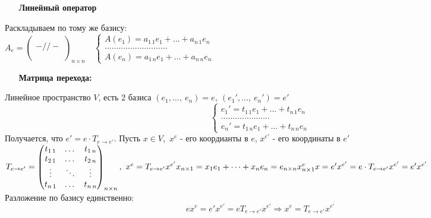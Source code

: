 \documentclass[12pt, letterpaper, twoside]{article}
\begin{document}
    \begin{enumerate}
        \item[\textbf{Линейный оператор}]
    \end{enumerate}
    Раскладываем по тому же базису:\\
    $A_e = \begin{pmatrix}
        \\
        -//-\\
        \\
    \end{pmatrix}_{n\times n}\quad \begin{cases}
        A(e_1) = a_{1\, 1} e_1 + \dots + a_{n\, 1}e_n\\
        \dots\dots\dots\dots\dots\dots\dots\dots\dots\\
        A(e_n) = a_{1\, n} e_1 + \dots + a_{n\, n}e_n
    \end{cases}$\\
    \begin{enumerate}
        \item[\textbf{Матрица перехода:}]
    \end{enumerate}
    Линейное пространство $V$, есть $2$ базиса $(e_1,\dots,\ e_n) = e,\ (e_1',\dots,\ e_n') = e'$
    \[\begin{cases}
        e_1' = t_{1\, 1}e_1 + \dots + t_{n\, 1}e_n\\
        \dots\dots\dots\dots\dots\dots\dots\\
        e_n' = t_{1\, n}e_1 + \dots + t_{n\, n}e_n
    \end{cases}\]
    Получается, что $e' = e\cdot T_{e\rightarrow e'}$. Пусть $x\in V$,\ $x^e$ - его коордианты в $e$, $x^{e'}$ - его координаты в $e'$\\
    $T_{e\rightarrow e'} =\begin{pmatrix}
        t_{1\,1} & \dots & t_{1\, n}\\
        t_{2\, 1} & \dots & t_{2\, n}\\
        \vdots & \ddots & \vdots\\
        t_{n\, 1} & \dots & t_{n\, n}
    \end{pmatrix}_{n\times n},\ x^e = T_{e\rightarrow e'} x^{e'}\\
    x_{n\times 1} = x_1e_1 + \dots + x_n e_n = e_{n\times n} x^e_{n\times 1}\\
    x = e' x^{e'} = e\cdot T_{e\rightarrow e'}x^{e'} = e'x^{e'}$\\
    Разложение по базису единственно:
    \[ex^e = e'x^{e'} = eT_{e\rightarrow e'}x^{e'} \Rightarrow x^e = T_{e\rightarrow e'}x^{e'}\]
\end{document}
